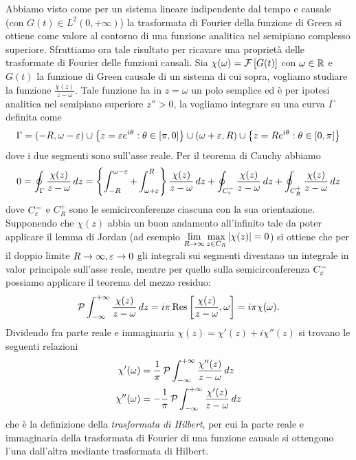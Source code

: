 Abbiamo visto come per un sistema lineare indipendente dal tempo e causale (con $ G(t) \in L^2(0, +\infty) $) la trasformata di Fourier della funzione di 
Green si ottiene come valore al contorno di una funzione analitica nel semipiano complesso superiore. Sfruttiamo ora tale risultato per ricavare 
una proprietà delle trasformate di Fourier delle funzioni causali. Sia $ \chi(\omega) = \F\left[ G(t) \right] $ con $ \omega \in \R $ e $ G(t) $ 
la funzione di Green causale di un sistema di cui sopra, vogliamo studiare la funzione $ \frac{\chi(z)}{z - \omega} $. Tale funzione 
ha in $ z = \omega $ un polo semplice ed è per ipotesi analitica nel semipiano superiore $ z'' > 0 $, la vogliamo integrare su una curva $ \Gamma $ 
definita come 
\begin{align}
  \Gamma = (-R, \omega - \eps) \cup \left\{ z = \eps e^{i\theta} : \theta \in [\pi, 0] \right\} \cup (\omega + \eps, R) \cup \left\{ z = Re^{i\theta} : \theta \in [0, \pi] \right\} 
\end{align}
dove i due segmenti sono sull'asse reale. Per il teorema di Cauchy abbiamo 
\begin{align}
  0 = \oint_\Gamma \frac{\chi(z)}{z - \omega} \, dz 
  = \left\{ \int_{-R}^{\omega - \eps} + \int_{\omega + \eps}^R \right\} \frac{\chi(z)}{z - \omega} \, dz
  + \oint_{C_\eps^-} \frac{\chi(z)}{z - \omega} \, dz + \oint_{C_R^+} \frac{\chi(z)}{z - \omega} \, dz 
\end{align}
dove $ C_\eps^- $ e $ C_R^+ $ sono le semicirconferenze ciascuna con la sua orientazione. Supponendo che $ \chi(z) $ abbia un buon andamento all'infinito 
tale da poter applicare il lemma di Jordan (ad esempio $ \DS \lim_{R\to\infty} \max_{z \in C_R} \abs{\chi(z)} = 0 $) si ottiene che per il doppio limite 
$ R \to \infty, \eps \to 0 $ gli integrali sui segmenti diventano un integrale in valor principale sull'asse reale, mentre per quello sulla 
semicirconferenza $ C_\eps^- $ possiamo applicare il teorema del mezzo residuo:
\begin{align}
  \P \int_{-\infty}^{+\infty} \frac{\chi(z)}{z - \omega} \, dz = i \pi \Res\left[ \frac{\chi(z)}{z - \omega}, \omega \right] 
  = i \pi \chi(\omega).
\end{align}
Dividendo fra parte reale e immaginaria $ \chi(z) = \chi'(z) + i \chi''(z) $ si trovano le seguenti relazioni
\begin{align}
  \chi'(\omega) &= \frac1\pi \P\int_{-\infty}^{+\infty} \frac{\chi''(z)}{z - \omega}\,dz
  \\
  \chi''(\omega) &= -\frac1\pi \P\int_{-\infty}^{+\infty} \frac{\chi'(z)}{z - \omega}\,dz
\end{align}
che è la definizione della \textit{trasformata di Hilbert}, per cui la parte reale e immaginaria della trasformata di Fourier di una funzione causale 
si ottengono l'una dall'altra mediante trasformata di Hilbert.

